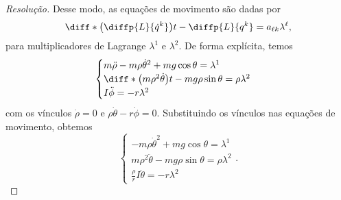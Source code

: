 \begin{proof}[Resolução]
    Desse modo, as equações de movimento são dadas por
    \begin{equation*}
        \diff*{\left(\diffp{L}{\dot{q}^k}\right)}{t} - \diffp{L}{q^k} = a_{\ell k} \lambda^{\ell},
    \end{equation*}
    para multiplicadores de Lagrange \(\lambda^1\) e \(\lambda^2\). De forma explícita, temos
    \begin{equation*}
        \begin{cases}
            m\ddot\rho - m\rho \dot\theta^2 + mg\cos\theta = \lambda^1\\
            \diff*{\left(m\rho^2\dot\theta\right)}{t} - mg\rho\sin\theta = \rho\lambda^2\\
            I\ddot\phi = - r \lambda^2
        \end{cases}
    \end{equation*}
    com os vínculos \(\dot{\rho} = 0\) e \(\rho\dot\theta - r\dot\phi = 0\). Substituindo os vínculos nas equações de movimento, obtemos
    \begin{equation*}
        \begin{cases}
            -m\rho \dot\theta^2 + mg \cos\theta = \lambda^1\\
            m\rho^2 \ddot\theta - mg\rho\sin\theta = \rho \lambda^2\\
            \frac{\rho}{r}I\ddot{\theta} = -r \lambda^2
        \end{cases}.
    \end{equation*}


\end{proof}
